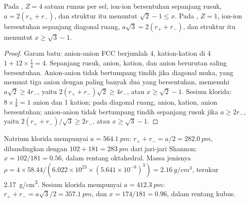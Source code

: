 \begin{proposition}\label{prop:b1:crystals-ionic-covalent:nacl-cscl}
Pada , $Z = 4$ satuan rumus per sel, ion-ion bersentuhan
sepanjang rusuk, $a = 2(r_+ + r_-)$, dan struktur itu menuntut
$\sqrt2 - 1
\le x$. Pada , $Z = 1$, ion-ion
bersentuhan sepanjang diagonal ruang, $a\sqrt3 = 2(r_+ + r_-)$, dan
struktur itu menuntut $x \ge \sqrt3 - 1$.
\end{proposition}

\begin{proof}
Garam batu: anion-anion  FCC berjumlah $4$, kation-kation di 4  $1 + 12 \times \frac14 = 4$. Sepanjang rusuk, anion, kation,
dan anion berurutan saling bersentuhan. Anion-anion tidak bertumpang
tindih jika diagonal muka, yang memuat tiga anion dengan paling banyak
dua yang bersentuhan, memenuhi $a\sqrt2 \ge 4r_-$, yaitu
$2(r_+ + r_-)\sqrt2 \ge
4r_-$, atau $x \ge \sqrt2 - 1$. Sesium klorida:
$8 \times \frac18 = 1$ anion dan 1 kation; pada diagonal ruang, anion,
kation, anion bersentuhan; anion-anion tidak bertumpang tindih
sepanjang rusuk jika $a \ge 2r_-$, yaitu $2(r_+ + r_-)/\sqrt3 \ge 2r_-$,
atau $x \ge \sqrt3 - 1$.
\end{proof}

\begin{example}\label{ex:b1:crystals-ionic-covalent:nacl}
Natrium klorida mempunyai $a = \qty{564.1}{pm}$: $r_+ + r_- = a/2 =
\qty{282.0}{pm}$, dibandingkan dengan $102 + 181 = \qty{283}{pm}$ dari
jari-jari Shannon; $x = 102/181 = 0.56$, dalam rentang oktahedral.
Massa jenisnya $\rho = 4 \times 58.44/(6.022 \times 10^{23} \times (5.641 \times
10^{-8})^3) = \qty{2.16}{g/cm^3}$, terukur \qty{2.17}{g/cm^3}. Sesium
klorida mempunyai $a = \qty{412.3}{pm}$: $r_+ + r_- = a\sqrt3/2 =
\qty{357.1}{pm}$, dan $x = 174/181 = 0.96$, dalam rentang kubus.
\end{example}

